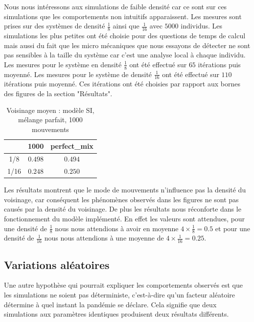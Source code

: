 Nous nous intéressons aux simulations de faible densité car ce sont sur ces simulations que les comportements non intuitifs apparaissent. Les mesures sont prises sur des systèmes de densité $\frac{1}{8}$ ainsi que $\frac{1}{16}$ avec $5000$ individus. Les simulations les plus petites ont été choisie pour des questions de temps de calcul mais aussi du fait que les micro mécaniques que nous essayons de détecter ne sont pas sensibles à la taille du système car c'est une analyse local à chaque individu.\\

Les mesures pour le système en densité $\frac{1}{8}$ ont été effectué sur $65$ itérations puis moyenné. Les mesures pour le système de densité $\frac{1}{16}$ ont été effectué sur $110$ itérations puis moyenné. Ces itérations ont été choisies par rapport aux bornes des figures de la section "Résultats".

\begin{table}[H]
\centering
\captionsetup{justification=centering}
\caption[Voisinage moyen : SI]{Voisinage moyen : modèle SI, mélange parfait, 1000 mouvements \label{tab:grid}}
\begin{tabular}{@{\extracolsep{\fill} } c|| c| c|}
 & 1000 & perfect\_mix\\ 
\midrule
\midrule
1/8 & $0.498$ & $0.494$\\
\midrule
1/16 & $0.248$ & $0.250$\\
\bottomrule
\end{tabular}
\end{table}

Les résultats montrent que le mode de mouvements n'influence pas la densité du voisinage, car conséquent les phénomènes observés dans les figures ne sont pas causés par la densité du voisinage. De plus les résultats nous réconforte dans le fonctionnement du modèle implémenté. En effet les valeurs sont attendues, pour une densité de $\frac{1}{8}$ nous nous attendions à avoir en moyenne $4\times \frac{1}{8} = 0.5$ et pour une densité de $\frac{1}{16}$ nous nous attendions à une moyenne de $4\times \frac{1}{16} = 0.25$.

\subsection{Variations aléatoires}

Une autre hypothèse qui pourrait expliquer les comportements observés est que les simulations ne soient pas déterministe, c'est-à-dire qu'un facteur aléatoire détermine à quel instant la pandémie se déclare. Cela signifie que deux simulations aux paramètres identiques produisent deux résultats différents.\\

